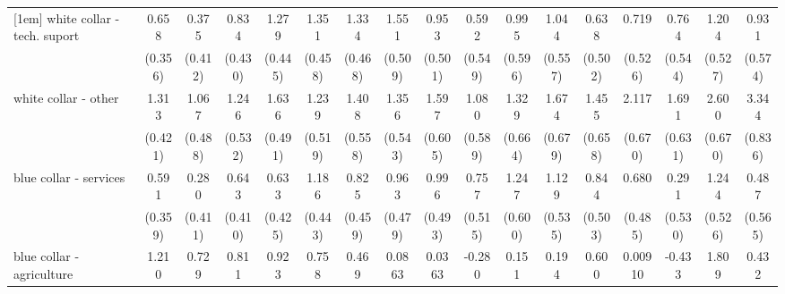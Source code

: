 {\begin{tabular}{l*{16}{c}}
[1em]
white collar - tech. suport&       0.658         &       0.375         &       0.834         &       1.279\sym{**} &       1.351\sym{**} &       1.334\sym{**} &       1.551\sym{**} &       0.953         &       0.592         &       0.995         &       1.044         &       0.638         &       0.719         &       0.764         &       1.204\sym{*}  &       0.931         \\
                    &     (0.356)         &     (0.412)         &     (0.430)         &     (0.445)         &     (0.458)         &     (0.468)         &     (0.509)         &     (0.501)         &     (0.549)         &     (0.596)         &     (0.557)         &     (0.502)         &     (0.526)         &     (0.544)         &     (0.527)         &     (0.574)         \\
[1em]
white collar - other&       1.313\sym{**} &       1.067\sym{*}  &       1.246\sym{*}  &       1.636\sym{***}&       1.239\sym{*}  &       1.408\sym{*}  &       1.356\sym{*}  &       1.597\sym{**} &       1.080         &       1.329\sym{*}  &       1.674\sym{*}  &       1.455\sym{*}  &       2.117\sym{**} &       1.691\sym{**} &       2.600\sym{***}&       3.344\sym{***}\\
                    &     (0.421)         &     (0.488)         &     (0.532)         &     (0.491)         &     (0.519)         &     (0.558)         &     (0.543)         &     (0.605)         &     (0.589)         &     (0.664)         &     (0.679)         &     (0.658)         &     (0.670)         &     (0.631)         &     (0.670)         &     (0.836)         \\
[1em]
blue collar - services&       0.591         &       0.280         &       0.643         &       0.633         &       1.186\sym{**} &       0.825         &       0.963\sym{*}  &       0.996\sym{*}  &       0.757         &       1.247\sym{*}  &       1.129\sym{*}  &       0.844         &       0.680         &       0.291         &       1.244\sym{*}  &       0.487         \\
                    &     (0.359)         &     (0.411)         &     (0.410)         &     (0.425)         &     (0.443)         &     (0.459)         &     (0.479)         &     (0.493)         &     (0.515)         &     (0.600)         &     (0.535)         &     (0.503)         &     (0.485)         &     (0.530)         &     (0.526)         &     (0.565)         \\
[1em]
blue collar - agriculture&       1.210\sym{*}  &       0.729         &       0.811         &       0.923         &       0.758         &       0.469         &      0.0863         &      0.0363         &      -0.280         &       0.151         &       0.194         &       0.600         &     0.00910         &      -0.433         &       1.809\sym{*}  &       0.432         \\

\end{tabular}}
